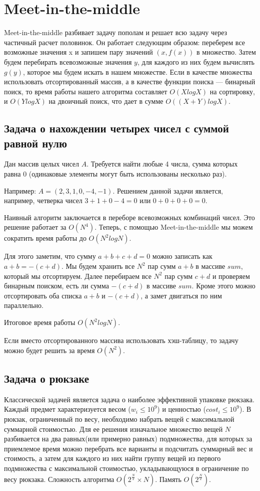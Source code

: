 \section{Meet-in-the-middle}

Meet-in-the-middle разбивает задачу пополам и решает всю задачу через частичный расчет половинок. Он работает следующим образом: переберем все возможные значения x и запишем пару значений $(x,f(x))$ в множество. Затем будем перебирать всевозможные значения $y$, для каждого из них будем вычислять $g(y)$, которое мы будем искать в нашем множестве. Если в качестве множества использовать отсортированный массив, а в качестве функции поиска — бинарный поиск, то время работы нашего алгоритма составляет $O(XlogX)$ на сортировку, и $O(YlogX)$ на двоичный поиск, что дает в сумме $O((X+Y)logX)$.

\subsection{Задача о нахождении четырех чисел с суммой равной нулю}

Дан массив целых чисел $A$. Требуется найти любые 4 числа, сумма которых равна 0 (одинаковые элементы могут быть использованы несколько раз).

Например: $A=(2,3,1,0,-4,-1)$. Решением данной задачи является, например, четверка чисел $3+1+0-4=0$ или $0+0+0+0=0$.

Наивный алгоритм заключается в переборе всевозможных комбинаций чисел. Это решение работает за $O(N^4)$. Теперь, с помощью Meet-in-the-middle мы можем сократить время работы до $O(N^{2}logN)$.

Для этого заметим, что сумму $a+b+c+d=0$ можно записать как $a+b=-(c+d)$. Мы будем хранить все $N^2$ пар сумм $a+b$ в массиве $sum$, который мы отсортируем. Далее перебираем все $N^2$ пар сумм $c+d$ и проверяем бинарным поиском, есть ли сумма $-(c+d)$ в массиве $sum$. Кроме этого можно отсортировать оба списка $a+b$ и $-(c+d)$, а замет двигаться по ним параллельно.

Итоговое время работы $O(N^{2}logN)$.

Если вместо отсортированного массива использовать хэш-таблицу, то задачу можно будет решить за время $O(N^2)$.

\subsection{Задача о рюкзаке}

Классической задачей является задача о наиболее эффективной упаковке рюкзака. Каждый предмет характеризуется весом ($w_{i} \le 10^{9}$) и ценностью ($cost_{i} \le 10^{9}$). В рюкзак, ограниченный по весу, необходимо набрать вещей с максимальной суммарной стоимостью. Для ее решения изначальное множество вещей $N$ разбивается на два равных(или примерно равных) подмножества, для которых за приемлемое время можно перебрать все варианты и подсчитать суммарный вес и стоимость, а затем для каждого из них найти группу вещей из первого подмножества с максимальной стоимостью, укладывающуюся в ограничение по весу рюкзака. Сложность алгоритма $O({2^{\frac{N}{2}}}\times{N})$. Память $O({2^{\frac{N}{2}}})$.

